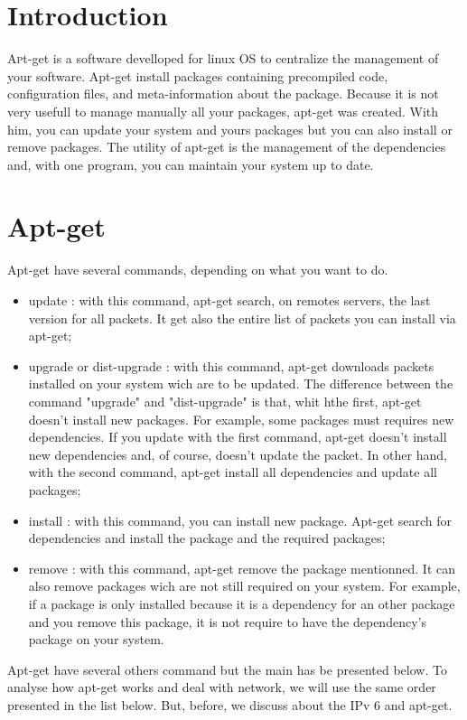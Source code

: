 \documentclass[twoside]{article}
\begin{document}
\begin{multicols}{2} %

\section{Introduction}

\lettrine[nindent=0em,lines=3]{A} pt-get is a software develloped for linux OS to centralize the management of your software.  Apt-get install packages  containing precompiled code, configuration files, and meta-information about the package.  Because it is not very usefull to manage manually all your packages, apt-get was created.  With him, you can update your system and yours packages but you can also install or remove packages.  The utility of apt-get is the management of the dependencies and, with one program, you can maintain your system up to date.

\section{Apt-get}
Apt-get have several commands, depending on what you want to do.
\begin{itemize}
	\item update : with this command, apt-get search, on remotes servers, the last version for all packets.  It get also the entire list of packets you can install via apt-get;
	\item upgrade or dist-upgrade : with this command, apt-get downloads packets installed on your system wich are to be updated.  The difference between the command "upgrade" and "dist-upgrade" is that, whit hthe first, apt-get doesn't install new packages.  For example, some packages must requires new dependencies.  If you update with the first command, apt-get doesn't install new dependencies and, of course, doesn't update the packet.  In other hand, with the second command, apt-get install all dependencies and update all packages;
	\item install : with this command, you can install new package.  Apt-get search for dependencies and install the package and the required packages;
	\item remove : with this command, apt-get remove the package mentionned.  It can also remove packages wich are not still required on your system.  For example, if a package is only installed because it is a dependency for an other package and you remove this package, it is not require to have the dependency's package on your system.
\end{itemize}
Apt-get have several others command but the main has be presented below.  To analyse how apt-get works and deal with network, we will use the same order presented in the list below.  But, before, we discuss about the IPv 6 and apt-get.


\end{multicols}
\end{document}
